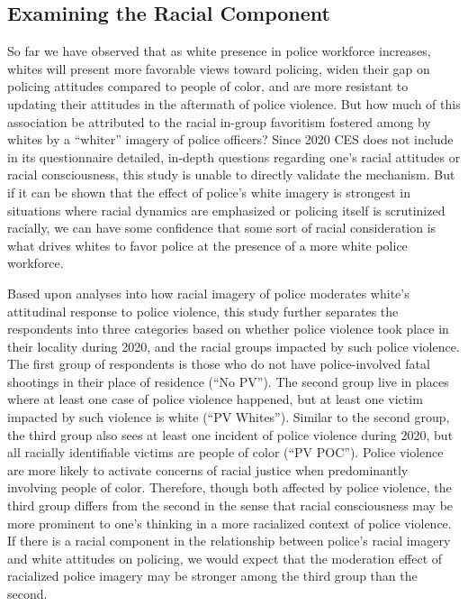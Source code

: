 \documentclass[
  12pt,
]{article}
\begin{document}
\hypertarget{examining-the-racial-component}{%
\subsection{Examining the Racial
Component}\label{examining-the-racial-component}}

So far we have observed that as white presence in police workforce
increases, whites will present more favorable views toward policing,
widen their gap on policing attitudes compared to people of color, and
are more resistant to updating their attitudes in the aftermath of
police violence. But how much of this association be attributed to the
racial in-group favoritism fostered among by whites by a ``whiter''
imagery of police officers? Since 2020 CES does not include in its
questionnaire detailed, in-depth questions regarding one's racial
attitudes or racial consciousness, this study is unable to directly
validate the mechanism. But if it can be shown that the effect of
police's white imagery is strongest in situations where racial dynamics
are emphasized or policing itself is scrutinized racially, we can have
some confidence that some sort of racial consideration is what drives
whites to favor police at the presence of a more white police workforce.

Based upon analyses into how racial imagery of police moderates white's
attitudinal response to police violence, this study further separates
the respondents into three categories based on whether police violence
took place in their locality during 2020, and the racial groups impacted
by such police violence. The first group of respondents is those who do
not have police-involved fatal shootings in their place of residence
(``No PV''). The second group live in places where at least one case of
police violence happened, but at least one victim impacted by such
violence is white (``PV Whites''). Similar to the second group, the
third group also sees at least one incident of police violence during
2020, but all racially identifiable victims are people of color (``PV
POC''). Police violence are more likely to activate concerns of racial
justice when predominantly involving people of color. Therefore, though
both affected by police violence, the third group differs from the
second in the sense that racial consciousness may be more prominent to
one's thinking in a more racialized context of police violence. If there
is a racial component in the relationship between police's racial
imagery and white attitudes on policing, we would expect that the
moderation effect of racialized police imagery may be stronger among the
third group than the second.
\end{document}
